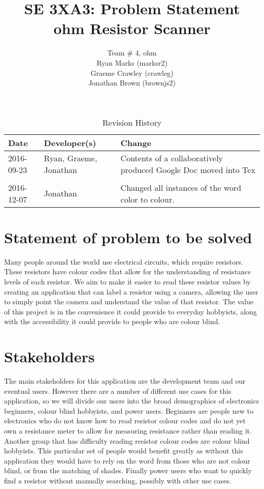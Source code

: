 \documentclass{article}
\title{SE 3XA3: Problem Statement\\ohm Resistor Scanner}
\author{Team \# 4, ohm
		\\ Ryan Marks (marksr2)
		\\ Graeme Crawley (crawleg)
		\\ Jonathan Brown (brownjs2)
}
\date{}
\begin{document}
\begin{table}[hp]
\caption{Revision History} \label{TblRevisionHistory}
\begin{tabularx}{\textwidth}{llX}
\toprule
\textbf{Date} & \textbf{Developer(s)} & \textbf{Change}\\
\midrule
2016-09-23 & Ryan, Graeme, Jonathan & Contents of a collaboratively produced Google Doc moved into Tex\\ \\
2016-12-07 & Jonathan & Changed all instances of the word color to colour.\\
\bottomrule
\end{tabularx}
\end{table}

\newpage

\maketitle

\section{Statement of problem to be solved}

Many people around the world use electrical circuits, which require resistors.
These resistors have colour codes that allow for the understanding of resistance levels of each resistor.
We aim to make it easier to read these resistor values by creating an application that can label a resistor using a camera, 
allowing the user to simply point the camera and understand the value of that resistor. 
The value of this project is in the convenience it could provide to everyday hobbyists, along with the accessibility it could provide to people who are colour blind.

\section{Stakeholders}

The main stakeholders for this application are the development team and our eventual users. 
However there are a number of different use cases for this application, so we will divide our users into the broad demographics of electronics beginners, colour blind hobbyists, and power users. Beginners are people new to electronics who do not know how to read resistor colour codes and do not yet own a resistance meter to allow for measuring resistance rather than reading it.
Another group that has difficulty reading resistor colour codes are colour blind hobbyists. 
This particular set of people would benefit greatly as without this application they would have to rely on the word from those who are not colour blind, or from the matching of shades. 
Finally power users who want to quickly find a resistor without manually searching, possibly with other use cases.
\end{document}
